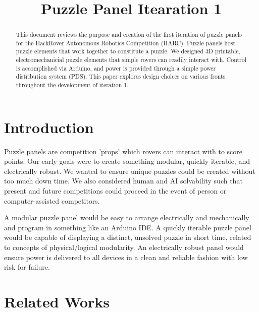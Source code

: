 \documentclass[conference]{IEEEtran}
\begin{document}
\title{Puzzle Panel Itearation 1\\}
\author{
}

\maketitle

\begin{abstract}
This document reviews the purpose and creation of the first iteration of puzzle panels for the HackRover Autonomous Robotics Competition (HARC). Puzzle panels host  puzzle elements that work together to constitute a puzzle. We designed 3D printable, electromechanicial puzzle elements that simple rovers can readily interact with. Control is accomplished via Arduino, and power is provided through a simple power distribution system (PDS). This paper explores design choices on various fronts throughout the development of iteration 1. 
\end{abstract}

\section{Introduction}
Puzzle panels are competition 'props' which rovers can interact with to score points. Our early goals were to create something modular, quickly iterable, and electrically robust. We wanted to ensure unique puzzles could be created without too much down time. We also considered human and AI solvability such that present and future competitions could proceed in the event of person or computer-assisted competitors.

A modular puzzle panel would be easy to arrange electrically and mechanically and program in something like an Arduino IDE. A quickly iterable puzzle panel would be capable of displaying a distinct, unsolved puzzle in short time, related to concepts of physical/logical modularity. An electrically robust panel would ensure power is delivered to all devices in a clean and reliable fashion with low risk for failure.

\section{Related Works}
\end{document}
